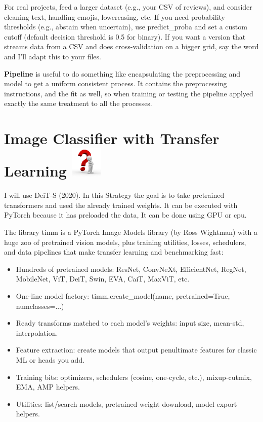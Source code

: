 \documentclass{article}
\begin{document}
For real projects, feed a larger dataset (e.g., your CSV of reviews), and consider cleaning text, handling emojis, lowercasing, etc.
If you need probability thresholds (e.g., abstain when uncertain), use predict\_proba and set a custom cutoff (default decision threshold is 0.5 for binary).
If you want a version that streams data from a CSV and does cross-validation on a bigger grid, say the word and I’ll adapt this to your files.


\textbf{Pipeline} is useful to do something like encapsulating the preprocessing and model to get a uniform consistent process. It contains the preprocessing instructions, and the fit as well, so when training or testing the pipeline applyed exactly the same treatment to all the processes.




\section{Image Classifier with Transfer Learning \includegraphics[width=2em]{question.jpeg}}
I will use DeiT-S (2020). 
In this Strategy the goal is to take pretrained transformers and used the already trained weights. It can be executed with PyTorch because it has preloaded the data, 
It can be done using GPU or cpu.

The library timm is a PyTorch Image Models library (by Ross Wightman) with a huge zoo of pretrained vision models, plus training utilities, losses, schedulers, and data pipelines that make transfer learning and benchmarking fast:
\begin{itemize}
    \item Hundreds of pretrained models: ResNet, ConvNeXt, EfficientNet, RegNet, MobileNet, ViT, DeiT, Swin, EVA, CaiT, MaxViT, etc.
    \item One-line model factory: timm.create\_model(name, pretrained=True, numclasses=...)
    \item Ready transforms matched to each model’s weights: input size, mean-std, interpolation.
    \item Feature extraction: create models that output penultimate features for classic ML or heads you add.
    \item Training bits: optimizers, schedulers (cosine, one-cycle, etc.), mixup-cutmix, EMA, AMP helpers.
    \item Utilities: list/search models, pretrained weight download, model export helpers.
\end{itemize}
\end{document}
